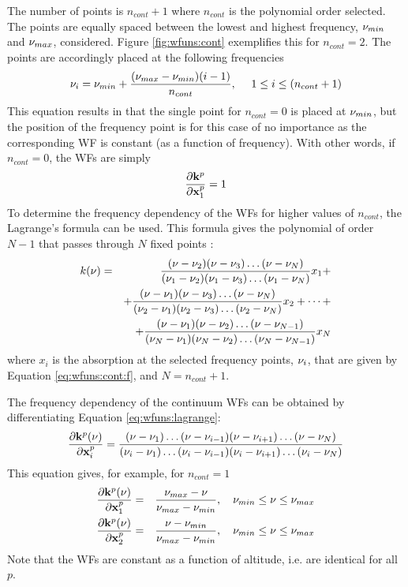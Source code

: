  
 The number of points is $n_{cont}+1$ where $n_{cont}$ is the
 polynomial order selected.  The points are equally spaced between the
 lowest and highest frequency, $\nu_{min}$ and $\nu_{max}$, considered.
 Figure \ref{fig:wfuns:cont} exemplifies this for $n_{cont}=2$.  The
 points are accordingly placed at the following frequencies
 \begin{equation}
   \nu_i = \nu_{min} + \frac{(\nu_{max}-\nu_{min})(i-1)}{n_{cont}}, \
          \quad 1 \leq i \leq (n_{cont}+1)
  \label{eq:wfuns:cont:f}
 \end{equation}
 This equation results in that the single point for $n_{cont}=0$ is
 placed at $\nu_{min}$, but the position of the frequency point is
 for this case of no importance as the corresponding WF is constant
 (as a function of frequency). With other words, 
 if $n_{cont}=0$, the WFs are simply 
 \begin{equation}
   \frac{\partial \mathbf{k}^p}{\partial \mathbf{x}^p_1} = 1
 \end{equation}
 To determine the frequency dependency of the WFs for higher values of
 $n_{cont}$, the Lagrange's formula can be used. This formula gives
 the polynomial of order $N-1$ that passes through $N$ fixed points
 \citep[][Eq. 3.1.1]{press:92}:
 \begin{eqnarray}
   k(\nu) &=& \frac{(\nu-\nu_2)(\nu-\nu_3)\dots(\nu-\nu_N)}
                  {(\nu_1-\nu_2)(\nu_1-\nu_3)\dots(\nu_1-\nu_N)}
           x_1 + \nonumber \\ 
       & & +\frac{(\nu-\nu_1)(\nu-\nu_3)\dots(\nu-\nu_N)}
                 {(\nu_2-\nu_1)(\nu_2-\nu_3)\dots(\nu_2-\nu_N)}
           x_2 + \cdots + \nonumber \\
       & & +\frac{(\nu-\nu_1)(\nu-\nu_2)\dots(\nu-\nu_{N-1})}
                 {(\nu_N-\nu_1)(\nu_N-\nu_2)\dots(\nu_N-\nu_{N-1})} x_N
  \label{eq:wfuns:lagrange}
 \end{eqnarray}
 where $x_i$ is the absorption at the selected frequency points, $\nu_i$,
 that are given by Equation \ref{eq:wfuns:cont:f}, and $N=n_{cont}+1$.
 
 The frequency dependency of the continuum WFs can be obtained by
 differentiating Equation \ref{eq:wfuns:lagrange}:
 \begin{equation}
   \frac{\partial \mathbf{k}^p(\nu)}{\partial \mathbf{x}^p_i} =
   \frac{(\nu-\nu_1)\dots(\nu-\nu_{i-1})(\nu-\nu_{i+1})\dots(\nu-\nu_N)}{(\nu_i-\nu_1)\dots(\nu_i-\nu_{i-1})(\nu_i-\nu_{i+1})\dots(\nu_i-\nu_N)}
 \end{equation}
 This equation gives, for example, for $n_{cont}=1$
 \begin{eqnarray}
   \frac{\partial \mathbf{k}^p(\nu)}{\partial \mathbf{x}^p_1} &=& \frac{\nu_{max}-\nu}
          {\nu_{max}-\nu_{min}}, \quad \nu_{min}\leq \nu \leq \nu_{max} \\
   \frac{\partial \mathbf{k}^p(\nu)}{\partial \mathbf{x}^p_2} &=& \frac{\nu-\nu_{min}}
          {\nu_{max}-\nu_{min}}, \quad \nu_{min}\leq \nu \leq \nu_{max}
 \end{eqnarray}
 Note that the WFs are constant as a function of altitude, i.e. are identical
 for all $p$.


